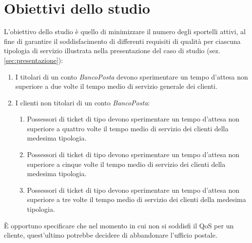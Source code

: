 \section{Obiettivi dello studio}\label{sec:obiettivi}
L'obiettivo dello studio è quello di minimizzare il numero degli sportelli attivi, al fine di garantire il soddisfacimento di differenti requisiti di qualità per ciascuna tipologia di servizio illustrata nella presentazione del caso di studio (sez. \ref{sec:presentazione}):

\begin{enumerate}[label=QoS-\arabic*), align=left, leftmargin=*]
\item I titolari di un conto \textsl{BancoPosta} devono sperimentare un tempo d'attesa non superiore a due volte il tempo medio di servizio generale dei clienti.
\item I clienti non titolari di un conto \textsl{BancoPosta}:
\begin{enumerate}
\item Possessori di ticket di tipo \uo{} devono sperimentare un tempo d'attesa non superiore a quattro volte il tempo medio di servizio dei clienti della medesima tipologia.
\item Possessori di ticket di tipo \pp{} devono sperimentare un tempo d'attesa non superiore a cinque volte il tempo medio di servizio dei clienti della medesima tipologia.
\item Possessori di ticket di tipo \sr{} devono sperimentare un tempo d'attesa non superiore a tre volte il tempo medio di servizio dei clienti della medesima tipologia.
\end{enumerate}
\end{enumerate}

È opportuno specificare che nel momento in cui non si soddisfi il QoS per un cliente, quest'ultimo potrebbe decidere di abbandonare l'ufficio postale.
